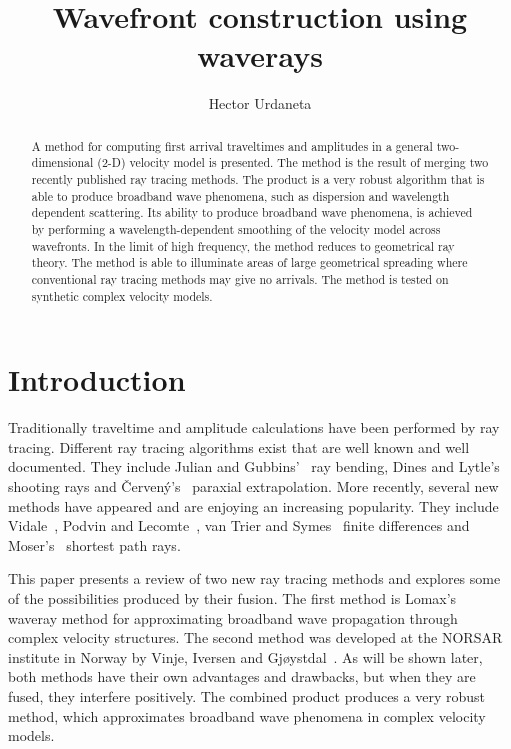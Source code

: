 

\title{Wavefront construction using waverays}
\author{Hector Urdaneta}

%
%
%
\def\CAKEDIR{.}
\def\figdir{./Fig}
%
\begin{abstract}
A method for computing first arrival traveltimes and amplitudes in
a general two-dimensional (\mbox{2-D}) velocity model is 
presented. The method is the result of merging two
recently published ray tracing methods. The product is a
very robust algorithm that is able to produce broadband wave phenomena,
such as dispersion and wavelength dependent scattering.
Its ability to produce broadband wave phenomena, is achieved
by performing a wavelength-dependent smoothing of the velocity model
across wavefronts. In the limit of high frequency, the method
reduces to geometrical ray theory.
The method is able to illuminate areas of large geometrical
spreading where conventional ray tracing methods may give no
arrivals. The method is tested on synthetic complex
velocity models.
\end{abstract}

\section{Introduction}

Traditionally traveltime and amplitude calculations have been 
performed by ray tracing. Different ray tracing algorithms
exist that are well known and well documented.
They include Julian and Gubbins'~ ray bending, 
Dines and Lytle's~
shooting rays and \v{C}erven\'{y}'s~ paraxial
extrapolation. More recently, several new methods have appeared
and are enjoying an increasing popularity.
They include Vidale~,
Podvin and Lecomte~,
van Trier and Symes~ finite differences
and Moser's~ shortest path rays.

This paper presents a review of two new ray tracing methods and
explores some of the possibilities produced by their fusion.
The first method is Lomax's~ waveray method for approximating
broadband wave propagation through complex velocity structures.
The second method was developed at the NORSAR institute 
in Norway by Vinje,
Iversen and Gj{\o}ystdal~. 
As will be shown later, both methods have their own advantages
and drawbacks, but when they are fused, they interfere positively.
The combined product produces a very robust method, 
which approximates broadband wave phenomena in
complex velocity models.

